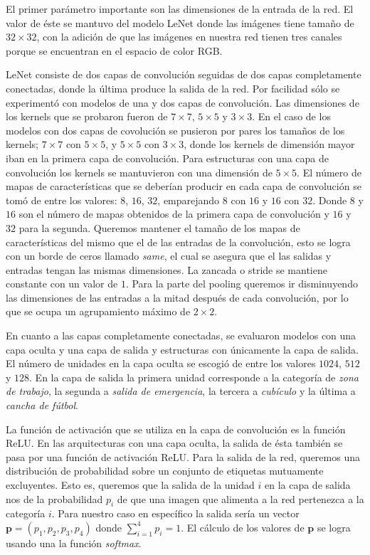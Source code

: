 El primer parámetro importante son las dimensiones de
la entrada de la red. El valor de éste se mantuvo del
modelo LeNet donde las imágenes tiene tamaño de $32 \times 32$,
con la adición de que las imágenes en nuestra red
tienen tres canales porque se encuentran en el espacio de 
color RGB.

LeNet consiste de dos capas de convolución seguidas de dos
capas completamente conectadas, donde la última produce
la salida de la red.
Por facilidad sólo se experimentó con modelos de una y dos capas
de convolución. Las dimensiones de los kernels  que se probaron fueron de 
$7 \times 7$,
$5 \times 5$ y $3 \times 3$. En el caso de los modelos con
dos capas de covolución se pusieron por pares los tamaños de
los kernels; $7 \times 7$ con
$5 \times 5$, y $5 \times 5$ con $3 \times 3$, donde los kernels
de dimensión mayor iban en la primera capa de convolución.
Para estructuras con una capa de convolución los kernels
se mantuvieron con una dimensión de $5 \times 5$.
El número de mapas de características que se deberían producir
en cada capa de convolución se tomó de entre los valores: $8$, 
$16$, $32$, emparejando $8$ con $16$ y $16$ con $32$.
Donde $8$ y $16$ son el número de mapas obtenidos de la primera 
capa de convolución y $16$ y $32$ para la segunda.
Queremos mantener el tamaño de los mapas de
características del mismo que el de las entradas de la convolución,
esto se logra con un borde de ceros llamado \textit{same}, 
el cual se asegura que el las salidas y entradas tengan las mismas dimensiones. 
La zancada o stride se mantiene constante con un valor de $1$.
Para la parte del pooling queremos ir disminuyendo las 
dimensiones de las entradas a la mitad después de cada
convolución, por lo que se ocupa un agrupamiento máximo 
de $2 \times 2$.


En cuanto a las capas completamente conectadas, se evaluaron
modelos con una capa oculta y una capa de salida y estructuras
con únicamente la capa de salida. El número de unidades 
en la capa oculta se escogió de entre los valores $1024$,
$512$ y $128$. En la capa de salida la primera unidad corresponde a la
categoría de \textit{zona de trabajo}, la segunda a 
\textit{salida de emergencia}, la tercera a \textit{cubículo}
y la última a \textit{cancha de fútbol}.

La función de activación que se utiliza en la capa de
convolución es la función ReLU. En las arquitecturas con
una capa oculta, la salida de ésta también se pasa 
por una función de activación ReLU. Para la salida 
de la red, queremos una distribución de probabilidad
sobre un conjunto de etiquetas mutuamente excluyentes.
Esto es, queremos que la salida de la unidad $i$ en la capa
de salida nos de la probabilidad $p_i$ de que una imagen que alimenta
a la red pertenezca a la categoría $i$. Para nuestro caso en específico
la salida sería un vector $\mathbf{p} = (p_1, p_2, p_3, p_4)$ donde $\sum_{i = 1}^4 p_i = 1$.
El cálculo de los valores de $\mathbf{p}$  se logra usando una la función \textit{softmax}.

